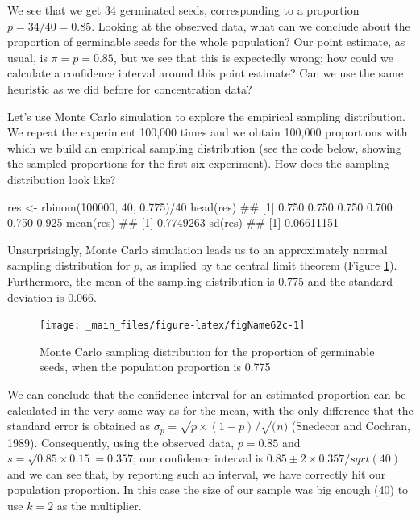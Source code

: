 \documentclass[a4paper,12pt,oneside]{book}
\newenvironment{Shaded}{\begin{snugshade}}{\end{snugshade}}
\newcommand{\DecValTok}[1]{#1}
\newcommand{\FloatTok}[1]{#1}
\newcommand{\SpecialCharTok}[1]{#1}
\newcommand{\DocumentationTok}[1]{#1}
\newcommand{\OtherTok}[1]{#1}
\newcommand{\FunctionTok}[1]{#1}
\newcommand{\NormalTok}[1]{#1}
\begin{document}
We see that we get 34 germinated seeds, corresponding to a proportion \(p = 34/40 = 0.85\). Looking at the observed data, what can we conclude about the proportion of germinable seeds for the whole population? Our point estimate, as usual, is \(\pi = p = 0.85\), but we see that this is expectedly wrong; how could we calculate a confidence interval around this point estimate? Can we use the same heuristic as we did before for concentration data?

Let's use Monte Carlo simulation to explore the empirical sampling distribution. We repeat the experiment 100,000 times and we obtain 100,000 proportions with which we build an empirical sampling distribution (see the code below, showing the sampled proportions for the first six experiment). How does the sampling distribution look like?

\begin{Shaded}
\begin{Highlighting}[]
\NormalTok{res }\OtherTok{\textless{}{-}} \FunctionTok{rbinom}\NormalTok{(}\DecValTok{100000}\NormalTok{, }\DecValTok{40}\NormalTok{, }\FloatTok{0.775}\NormalTok{)}\SpecialCharTok{/}\DecValTok{40}
\FunctionTok{head}\NormalTok{(res)}
\DocumentationTok{\#\# [1] 0.750 0.750 0.750 0.700 0.750 0.925}
\FunctionTok{mean}\NormalTok{(res)}
\DocumentationTok{\#\# [1] 0.7749263}
\FunctionTok{sd}\NormalTok{(res)}
\DocumentationTok{\#\# [1] 0.06611151}
\end{Highlighting}
\end{Shaded}

Unsurprisingly, Monte Carlo simulation leads us to an approximately normal sampling distribution for \(p\), as implied by the central limit theorem (Figure \ref{fig:figName62c}). Furthermore, the mean of the sampling distribution is 0.775 and the standard deviation is 0.066.

\begin{figure}

{\centering \texttt{[image: \_main\_files/figure-latex/figName62c-1]} 

}

\caption{Monte Carlo sampling distribution for the proportion of germinable seeds, when the population proportion is 0.775}\label{fig:figName62c}
\end{figure}

We can conclude that the confidence interval for an estimated proportion can be calculated in the very same way as for the mean, with the only difference that the standard error is obtained as \(\sigma_p = \sqrt{p \times (1 - p)}/\sqrt(n)\) (Snedecor and Cochran, 1989). Consequently, using the observed data, \(p = 0.85\) and \(s = \sqrt{0.85 \times 0.15} = 0.357\); our confidence interval is \(0.85 \pm 2 \times 0.357/sqrt(40)\) and we can see that, by reporting such an interval, we have correctly hit our population proportion. In this case the size of our sample was big enough (40) to use \(k = 2\) as the multiplier.
\end{document}
